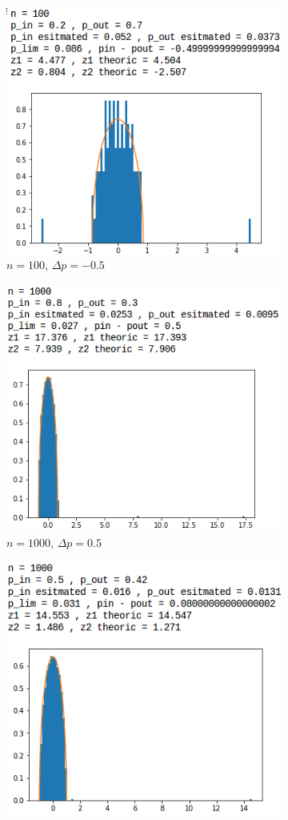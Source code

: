 \begin{figure}[H]
\begin{subfigure}{.5\textwidth}
		\includegraphics[scale=0.58]{static/spectral_n100_pin02_pout07.png}
		\caption{$n=100$, $\Delta p=-0.5$}
		\label{n100delta-05}
	\end{subfigure}
	\begin{subfigure}{.5\textwidth}
		\centering
		\includegraphics[scale=0.58]{static/spectral_n1000_pin08_pout03.png}
		\caption{$n=1000$, $\Delta p=0.5$}
		\label{n1000delta05}
	\end{subfigure}
	\begin{subfigure}{.5\textwidth}
		\centering
		\includegraphics[scale=0.58]{static/spectral_n1000_pin05_pout042.png}

\end{subfigure}
\end{figure}
